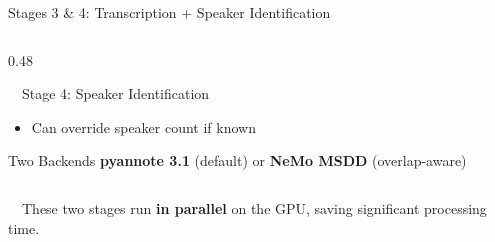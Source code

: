 \documentclass[aspectratio=169, 11pt]{beamer}
\begin{document}
\begin{frame}{Stages 3 \& 4: Transcription + Speaker Identification}
\begin{columns}[T]
\begin{column}{0.48\textwidth}
\begin{block}{\faUsers\ \ Stage 4: Speaker Identification}
\begin{itemize}
                    \item Can override speaker count if known
                \end{itemize}
                \vspace{0.2em}
                \begin{exampleblock}{Two Backends}
                    \scriptsize
                    \textbf{pyannote 3.1} (default) or \textbf{NeMo MSDD} (overlap-aware)
                \end{exampleblock}
            \end{block}
        \end{column}
    \end{columns}
    \vspace{0.3em}
    \centering
    \colorbox{pipeorange!15}{\parbox{0.7\textwidth}{\centering
        \small\faRocket\ \ These two stages run \textbf{in parallel} on the GPU, saving significant processing time.
    }}
\end{frame}
\end{document}
